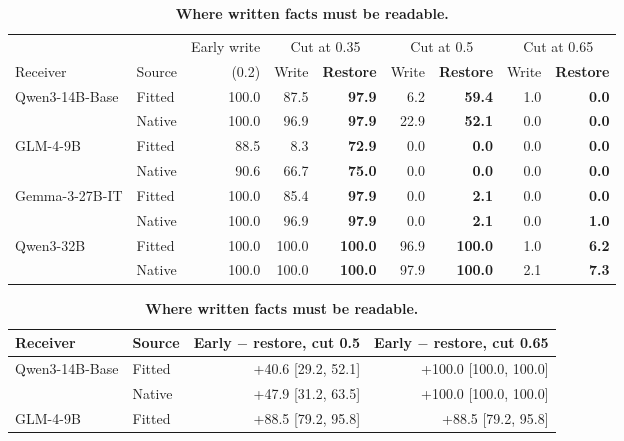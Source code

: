 \begin{table}[!htbp]
\caption{\textbf{Where written facts must be readable.}}
\label{tab:diag_d1}
\centering\small
\setlength{\tabcolsep}{3pt}\renewcommand{\arraystretch}{1.1}
\begin{tabular*}{\linewidth}{@{\extracolsep{\fill}}llrrrrrrr@{}}
\toprule
 & & Early write & \multicolumn{2}{c}{Cut at 0.35} & \multicolumn{2}{c}{Cut at 0.5} & \multicolumn{2}{c}{Cut at 0.65} \\\cmidrule(lr){4-5}\cmidrule(lr){6-7}\cmidrule(l){8-9}
Receiver & Source & (0.2) & Write & \textbf{Restore} & Write & \textbf{Restore} & Write & \textbf{Restore} \\
\midrule
Qwen3-14B-Base & Fitted & 100.0 & 87.5 & \textbf{97.9} & 6.2 & \textbf{59.4} & 1.0 & \textbf{0.0} \\
 & Native & 100.0 & 96.9 & \textbf{97.9} & 22.9 & \textbf{52.1} & 0.0 & \textbf{0.0} \\
\addlinespace[2pt]
GLM-4-9B & Fitted & 88.5 & 8.3 & \textbf{72.9} & 0.0 & \textbf{0.0} & 0.0 & \textbf{0.0} \\
 & Native & 90.6 & 66.7 & \textbf{75.0} & 0.0 & \textbf{0.0} & 0.0 & \textbf{0.0} \\
\addlinespace[2pt]
Gemma-3-27B-IT & Fitted & 100.0 & 85.4 & \textbf{97.9} & 0.0 & \textbf{2.1} & 0.0 & \textbf{0.0} \\
 & Native & 100.0 & 96.9 & \textbf{97.9} & 0.0 & \textbf{2.1} & 0.0 & \textbf{1.0} \\
\addlinespace[2pt]
Qwen3-32B & Fitted & 100.0 & 100.0 & \textbf{100.0} & 96.9 & \textbf{100.0} & 1.0 & \textbf{6.2} \\
 & Native & 100.0 & 100.0 & \textbf{100.0} & 97.9 & \textbf{100.0} & 2.1 & \textbf{7.3} \\
\bottomrule
\end{tabular*}
\par\vspace{6pt}
{\footnotesize\setlength{\tabcolsep}{3pt}
\begin{tabular*}{\linewidth}{@{\extracolsep{\fill}}llrr@{}}
\toprule
Receiver & Source & Early $-$ restore, cut 0.5 & Early $-$ restore, cut 0.65 \\
\midrule
Qwen3-14B-Base & Fitted & +40.6 [29.2, 52.1] & +100.0 [100.0, 100.0] \\
 & Native & +47.9 [31.2, 63.5] & +100.0 [100.0, 100.0] \\
\addlinespace[2pt]
GLM-4-9B & Fitted & +88.5 [79.2, 95.8] & +88.5 [79.2, 95.8] \\

\end{tabular*}}
\end{table}
